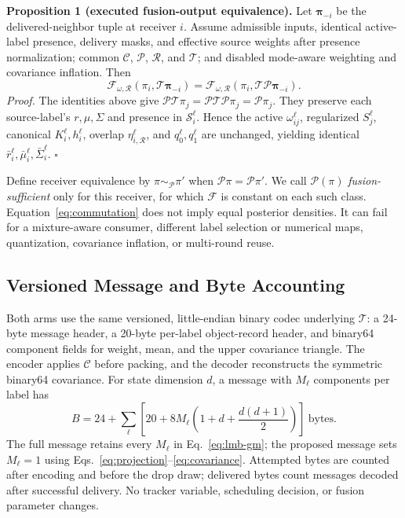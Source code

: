 \textbf{Proposition 1 (executed fusion-output equivalence).}
Let $\boldsymbol\pi_{-i}$ be the delivered-neighbor tuple at receiver $i$.
Assume admissible inputs, identical active-label presence, delivery masks, and
effective source weights after presence normalization; common $\mathcal C$,
$\mathcal P$, $\mathcal R$, and $\mathcal T$; and disabled mode-aware weighting
and covariance inflation. Then
\begin{equation}
 \mathcal F_{\omega,\mathcal R}(\pi_i,\mathcal T\boldsymbol\pi_{-i})=
 \mathcal F_{\omega,\mathcal R}
 (\pi_i,\mathcal T\mathcal P\boldsymbol\pi_{-i}).
 \label{eq:commutation}
\end{equation}
\emph{Proof.} The identities above give
$\mathcal P\mathcal T\pi_j=\mathcal P\mathcal T\mathcal P\pi_j=
\mathcal P\pi_j$. They preserve each source-label's $r,\mu,\Sigma$ and
presence in $\mathcal S_i^\ell$. Hence the active $\omega_{ij}^\ell$,
regularized $S_j^\ell$, canonical $K_i^\ell,h_i^\ell$, overlap
$\eta_{i,\mathcal R}^\ell$, and $q_0^\ell,q_1^\ell$ are unchanged, yielding
identical $\bar r_i^\ell,\bar\mu_i^\ell,\bar\Sigma_i^\ell$. $\square$

Define receiver equivalence by $\pi\sim_{\mathcal P}\pi'$ when
$\mathcal P\pi=\mathcal P\pi'$. We call $\mathcal P(\pi)$
\emph{fusion-sufficient} only for this receiver, for which $\mathcal F$ is
constant on each such class.
Equation~\eqref{eq:commutation} does not imply equal posterior densities. It can
fail for a mixture-aware consumer, different label selection or numerical maps,
quantization, covariance inflation, or multi-round reuse.

\subsection{Versioned Message and Byte Accounting}

Both arms use the same versioned, little-endian binary codec underlying
$\mathcal T$: a 24-byte message header, a 20-byte per-label object-record
header, and binary64 component fields for weight, mean, and the upper covariance
triangle. The encoder applies $\mathcal C$ before
packing, and the decoder reconstructs the symmetric binary64 covariance. For
state dimension $d$, a message with $M_\ell$ components per label has
\begin{equation}
 B=24+\sum_{\ell}\left[20+8M_\ell
 \left(1+d+\frac{d(d+1)}{2}\right)\right]\ \text{bytes}.
 \label{eq:wire-bytes}
\end{equation}
The full message retains every $M_\ell$ in Eq.~\eqref{eq:lmb-gm}; the proposed
message sets $M_\ell=1$ using Eqs.~\eqref{eq:projection}--\eqref{eq:covariance}.
Attempted bytes are counted after encoding and before the drop draw; delivered
bytes count messages decoded after successful delivery. No tracker variable,
scheduling decision, or fusion parameter changes.
